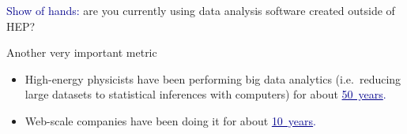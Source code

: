 \documentclass[aspectratio=169]{beamer}
\begin{document}
\begin{frame}{}
\huge
\vspace{0.5 cm}
\begin{center}
\textcolor{darkblue}{Show of hands:} are you currently using data analysis software created outside of HEP?

\vspace{1 cm}
\end{center}
\end{frame}

\begin{frame}{Another very important metric}
\Large
\vspace{0.25 cm}
\begin{itemize}
\item High-energy physicists have been performing big data analytics (i.e.\ reducing large datasets to statistical inferences with computers) for about \textcolor{darkblue}{\underline{50~years}.}
\item<2-> Web-scale companies have been doing it for about \textcolor{darkblue}{\underline{10~years}.}
\end{itemize}

\vspace{0.5 cm}

\vspace{0.5 cm}

\vspace{0.2 cm}
\end{frame}
\end{document}
